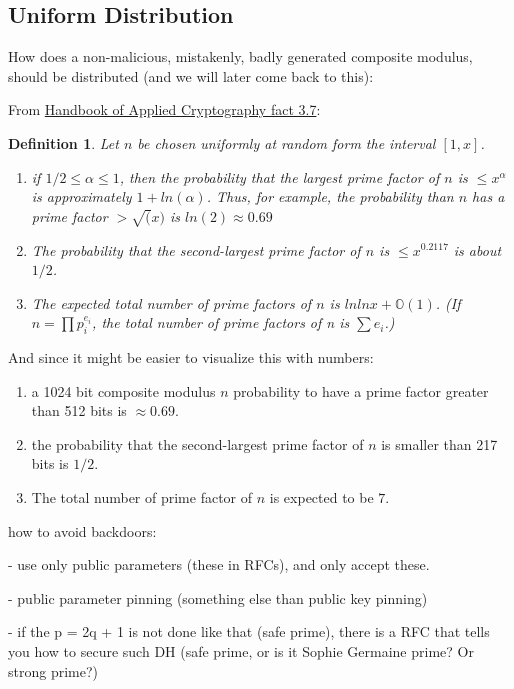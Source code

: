 \documentclass[a4paper,11pt,twocolumn]{article}
\newtheorem{definition}{Definition}
\begin{document}
\subsection{Uniform Distribution}

How does a non-malicious, mistakenly, badly generated composite modulus, should be distributed (and we will later come back to this):

From \href{http://cacr.uwaterloo.ca/hac/about/chap3.pdf}{Handbook of Applied Cryptography fact 3.7}:

\begin{definition}
    Let $n$ be chosen uniformly at random form the interval $[1, x]$.
    \begin{enumerate}
        \item if $1/2 \leq \alpha \leq 1$, then the probability that the largest prime factor of $n$ is $\leq x^{\alpha}$ is approximately $1+ ln(\alpha)$. Thus, for example, the probability than $n$ has a prime factor $> \sqrt(x)$ is $ln(2) \approx 0.69$
        \item The probability that the second-largest prime factor of $n$ is $\leq x^{0.2117}$ is about $1/2$. 
        \item The expected total number of prime factors of $n$ is $ln ln x + \mathbb{O}(1)$. (If $n = \prod p_i^{e_i}$, the total number of prime factors of n is $\sum e_i$.)
    \end{enumerate} 
\end{definition}

And since it might be easier to visualize this with numbers:

\begin{enumerate}
    \item a 1024 bit composite modulus $n$ probability to have a prime factor greater than 512 bits is $\approx 0.69$.
    \item the probability that the second-largest prime factor of $n$ is smaller than 217 bits is $1/2$.
    \item The total number of prime factor of $n$ is expected to be $7$.
\end{enumerate}

how to avoid backdoors:

- use only public parameters (these in RFCs), and only accept these. 

- public parameter pinning (something else than public key pinning)

- if the p = 2q + 1 is not done like that (safe prime), there is a RFC that tells you how to secure such DH (safe prime, or is it Sophie Germaine prime? Or strong prime?)
\end{document}
